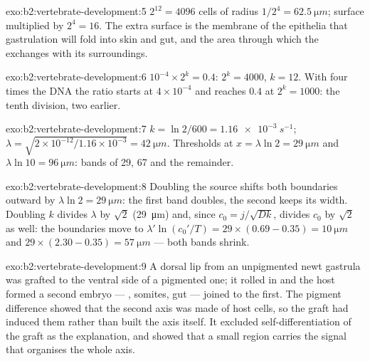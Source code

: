\begin{solution}{exo:b2:vertebrate-development:5}
$2^{12} = 4096$ cells of radius $1/2^{4} = \qty{62.5}{\micro m}$;
surface multiplied by $2^{4} = 16$. The extra surface is the
membrane of the epithelia that gastrulation will fold into skin and
gut, and the area through which the  exchanges with its
surroundings.
\end{solution}

\begin{solution}{exo:b2:vertebrate-development:6}
$10^{-4}\times 2^{k} = 0.4$: $2^{k} = 4000$, $k = 12$. With four
times the DNA the ratio starts at $4\times 10^{-4}$ and reaches $0.4$
at $2^{k} = 1000$: the tenth division, two earlier.
\end{solution}

\begin{solution}{exo:b2:vertebrate-development:7}
$k = \ln 2/600 = \qty{1.16e-3}{s^{-1}}$; $\lambda = \sqrt{2\times
10^{-12}/1.16\times 10^{-3}} = \qty{42}{\micro m}$. Thresholds at
$x = \lambda\ln 2 = \qty{29}{\micro m}$ and $\lambda\ln 10 =
\qty{96}{\micro m}$: bands of 29, 67 and the remainder.
\end{solution}

\begin{solution}{exo:b2:vertebrate-development:8}
Doubling the source shifts both boundaries outward by $\lambda\ln
2 = \qty{29}{\micro m}$: the first band doubles, the second keeps
its width. Doubling $k$ divides $\lambda$ by $\sqrt 2$
(\qty{29}{\micro m}) and, since $c_0 = j/\sqrt{Dk}$, divides $c_0$ by
$\sqrt 2$ as well: the boundaries move to $\lambda'\ln(c_0'/T) =
29\times(0.69 - 0.35) = \qty{10}{\micro m}$ and $29\times(2.30 -
0.35) = \qty{57}{\micro m}$ --- both bands shrink.
\end{solution}

\begin{solution}{exo:b2:vertebrate-development:9}
A dorsal lip from an unpigmented newt gastrula was grafted to the
ventral side of a pigmented one; it rolled in and the host formed a
second embryo --- , somites, gut --- joined to the first.
The pigment difference showed that the second axis was made of host
cells, so the graft had induced them rather than built the axis
itself. It excluded self-differentiation of the graft as the
explanation, and showed that a small region carries the signal that
organises the whole axis.
\end{solution}

